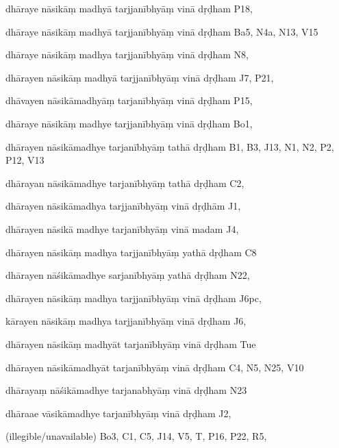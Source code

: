 \begin{marma}[hp02_009]
\begin{marma}[hp02_011]
\begin{marma}[hp02_65cd]
\item[dhāraye nāsikāṃ madhyā tarjjanībhyāṃ vinā dṛḍham] P18,
\item[dhāraye nāsikāṃ madhyā tarjjanībhyāṃ vinā dṛḍham] Ba5, N4a, N13, V15
\item[dhāraye nāsikāṃ madhya tarjjanībhyāṃ vinā dṛḍham] N8, 
\item[dhārayen nāsikāṃ madhyā tarjjanībhyāṃ vinā dṛḍham] J7, P21, 
\item[dhāvayen nāsikāmadhyāṃ tarjanībhyāṃ vinā dṛḍham] P15,
\item[dhāraye nāsikāṃ madhye tarjjanībhyāṃ vinā dṛḍham] Bo1,
\item[dhārayen nāsikāmadhye tarjanībhyāṃ tathā dṛḍham] B1, B3, J13, N1, N2, P2, P12, V13
\item[dhārayan nāsikāmadhye tarjanībhyāṃ tathā dṛḍham] C2, 
\item[dhārayen nāsikāmadhya tarjjanībhyāṃ vinā dṛḍhām] J1,
\item[dhārayen nāsikā madhye tarjanībhyāṃ vinā madam] J4,
\item[dhārayen nāsikāṃ madhya tarjjanībhyāṃ yathā dṛḍham] C8
\item[dhārayen nāśikāmadhye sarjanībhyāṃ yathā dṛḍham] N22,
\item[dhārayen nāsikāṃ madhya tarjjanībhyāṃ vinā dṛḍham] J6pc,
\item[kārayen nāsikāṃ madhya tarjjanībhyāṃ vinā dṛḍham] J6,
\item[dhārayen nāsikāṃ madhyāt tarjanībhyāṃ vinā dṛḍham] Tue
\item[dhārayen nāsikāmadhyāt tarjanībhyāṃ vinā dṛḍham] C4, N5, N25, V10
\item[dhārayaṃ nāśikāmadhye tarjanabhyāṃ vinā dṛḍham] N23
\item[dhāraae vāsikāmadhye tarjanībhyāṃ vinā dṛḍham] J2,
\item[(illegible/unavailable)] Bo3, C1, C5, J14, V5, T, P16, P22, R5,
  \begin{description}

    \end{description}
 \end{marma}


\end{marma}
\end{marma}
